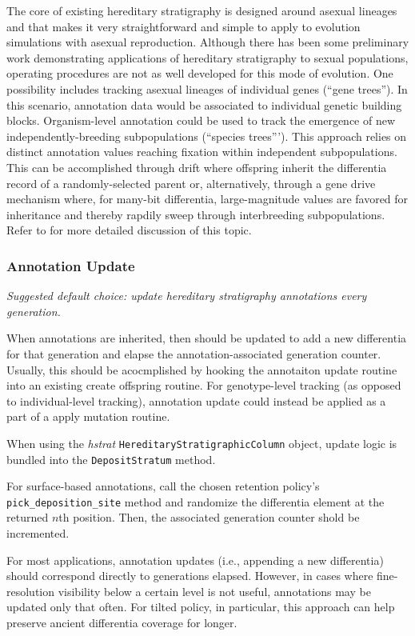 The core of existing hereditary stratigraphy is designed around asexual lineages and that makes it very straightforward and simple to apply to evolution simulations with asexual reproduction.
Although there has been some preliminary work demonstrating applications of hereditary stratigraphy to sexual populations, operating procedures are not as well developed for this mode of evolution.
One possibility includes tracking asexual lineages of individual genes (``gene trees'').
In this scenario, annotation data would be associated to individual genetic building blocks.
Organism-level annotation could be used to track the emergence of new independently-breeding subpopulations (``species trees''').
This approach relies on distinct annotation values reaching fixation within independent subpopulations.
This can be accomplished through drift where offspring inherit the differentia record of a randomly-selected parent or, alternatively, through a gene drive mechanism where, for many-bit differentia, large-magnitude values are favored for inheritance and thereby rapdily sweep through interbreeding subpopulations.
Refer to \citet{moreno2024methods} for more detailed discussion of this topic.

\subsubsection{Annotation Update}
\textit{Suggested default choice: update hereditary stratigraphy annotations every generation.}

When annotations are inherited, then should be updated to add a new differentia for that generation and elapse the annotation-associated generation counter.
Usually, this should be acocmplished by hooking the annotaiton update routine into an existing create offspring routine.
For genotype-level tracking (as opposed to individual-level tracking), annotation update could instead be applied as a part of a apply mutation routine.

When using the \textit{hstrat} \texttt{HereditaryStratigraphicColumn} object, update logic is bundled into the \texttt{DepositStratum} method.

For surface-based annotations, call the chosen retention policy's \texttt{pick\_deposition\_site} method and randomize the differentia element at the returned $n$th position.
Then, the associated generation counter shold be incremented.

For most applications, annotation updates (i.e., appending a new differentia) should correspond directly to generations elapsed.
However, in cases where fine-resolution visibility below a certain level is not useful, annotations may be updated only that often.
For tilted policy, in particular, this approach can help preserve ancient differentia coverage for longer.

